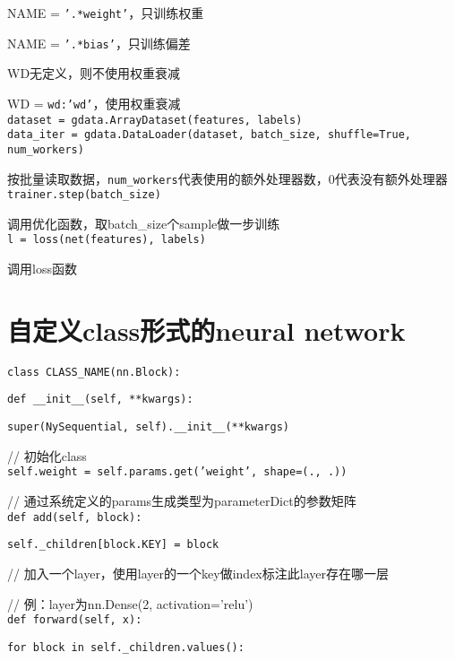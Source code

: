 \documentclass[UTF8]{ctexart}
\begin{document}
  \quad NAME = \texttt{'.*weight'}，只训练权重 
  
  \quad NAME = \texttt{'.*bias'}，只训练偏差
    
  WD无定义，则不使用权重衰减
  
  \quad WD = \texttt{wd:'wd'}，使用权重衰减\\
\texttt{dataset = gdata.ArrayDataset(features, labels)}\\
\texttt{data\_iter = gdata.DataLoader(dataset, batch\_size, shuffle=True, num\_workers)}

  按批量读取数据，\texttt{num\_workers}代表使用的额外处理器数，0代表没有额外处理器\\
\texttt{trainer.step(batch\_size)}

  调用优化函数，取batch\_size个sample做一步训练\\
\texttt{l = loss(net(features), labels)}

  调用loss函数

\section{自定义class形式的neural network}
\noindent \texttt{class CLASS\_NAME(nn.Block):}

  \texttt{def \_\_init\_\_(self, **kwargs):}

  \quad \texttt{super(NySequential, self).\_\_init\_\_(**kwargs)}

  // 初始化class\\

  \quad \texttt{self.weight = self.params.get('weight', shape=(., .))}

  // 通过系统定义的params生成类型为parameterDict的参数矩阵\\

  \texttt{def add(self, block):}

  \quad \texttt{self.\_children[block.KEY] = block}

  // 加入一个layer，使用layer的一个key做index标注此layer存在哪一层

  // 例：layer为nn.Dense(2, activation='relu')\\

  \texttt{def forward(self, x):}

  \quad \texttt{for block in self.\_children.values():}
\end{document}
